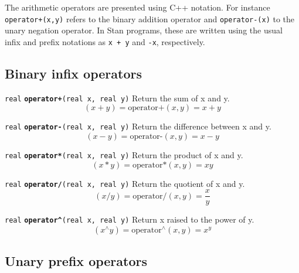 \documentclass[
  10pt,
]{book}
\begin{document}
The arithmetic operators are presented using C++ notation. For
instance \texttt{operator+(x,y)} refers to the binary addition operator and
\texttt{operator-(x)} to the unary negation operator. In Stan programs,
these are written using the usual infix and prefix notations as \texttt{x\ +\ y} and \texttt{-x}, respectively.

\hypertarget{binary-infix-operators-1}{%
\subsection{Binary infix operators}\label{binary-infix-operators-1}}


\texttt{real} \textbf{\texttt{operator+}}\texttt{(real\ x,\ real\ y)}\newline
Return the sum of x and y. \[ (x + y) = \text{operator+}(x,y) = x+y \]


\texttt{real} \textbf{\texttt{operator-}}\texttt{(real\ x,\ real\ y)}\newline
Return the difference between x and y. \[ (x - y) =
\text{operator-}(x,y) = x - y \]


\texttt{real} \textbf{\texttt{operator*}}\texttt{(real\ x,\ real\ y)}\newline
Return the product of x and y. \[ (x * y) = \text{operator*}(x,y) = xy
\]


\texttt{real} \textbf{\texttt{operator/}}\texttt{(real\ x,\ real\ y)}\newline
Return the quotient of x and y. \[ (x / y) = \text{operator/}(x,y) =
\frac{x}{y} \]


\texttt{real} \textbf{\texttt{operator\^{}}}\texttt{(real\ x,\ real\ y)}\newline
Return x raised to the power of y. \[ (x^\mathrm{\wedge}y) =
\text{operator}^\mathrm{\wedge}(x,y) = x^y \]

\hypertarget{unary-prefix-operators-1}{%
\subsection{Unary prefix operators}\label{unary-prefix-operators-1}}
\end{document}
